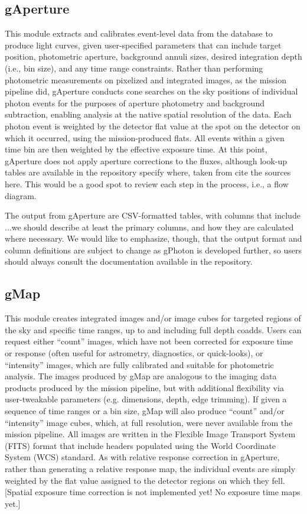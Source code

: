 \documentclass[5p]{elsarticle}
\begin{document}
\subsection{gAperture}
This module extracts and calibrates event-level data from the database to produce light curves, given user-specified parameters that can include target position, photometric aperture, background annuli sizes, desired integration depth (i.e., bin size), and any time range constraints. Rather than performing photometric measurements on pixelized and integrated images, as the mission pipeline did, gAperture conducts cone searches on the sky positions of individual photon events for the purposes of aperture photometry and background subtraction, enabling analysis at the native spatial resolution of the data. Each photon event is weighted by the detector flat value at the spot on the detector on which it occurred, using the mission-produced flats. All events within a given time bin are then weighted by the effective exposure time.  At this point, gAperture does not apply aperture corrections to the fluxes, although look-up tables are available in the repository {\color{red}specify where}, taken from {\color{red}cite the sources here.}  {\color{red}This would be a good spot to review each step in the process, i.e., a flow diagram.}

The output from gAperture are CSV-formatted tables, with columns that include {\color{red}...we should describe at least the primary columns, and how they are calculated where necessary.}  We would like to emphasize, though, that the output format and column definitions are subject to change as gPhoton is developed further, so users should always consult the documentation available in the repository.

\subsection{gMap}
This module creates integrated images and/or image cubes for targeted regions of the sky and specific time ranges, up to and including full depth coadds. Users can request either ``count'' images, which have not been corrected for exposure time or response (often useful for astrometry, diagnostics, or quick-looks), or ``intensity'' images, which are fully calibrated and suitable for photometric analysis. The images produced by gMap are analogous to the imaging data products produced by the mission pipeline, but with additional flexibility via user-tweakable parameters (e.g. dimensions, depth, edge trimming). If given a sequence of time ranges or a bin size, gMap will also produce ``count'' and/or ``intensity'' image cubes, which, at full resolution, were never available from the mission pipeline. All images are written in the Flexible Image Transport System (FITS) format that include headers populated using the World Coordinate System (WCS) standard.  As with relative response correction in gAperture, rather than generating a relative response map, the individual events are simply weighted by the flat value assigned to the detector regions on which they fell. {\color{red}[Spatial exposure time correction is not implemented yet!  No exposure time maps yet.]}
\end{document}
